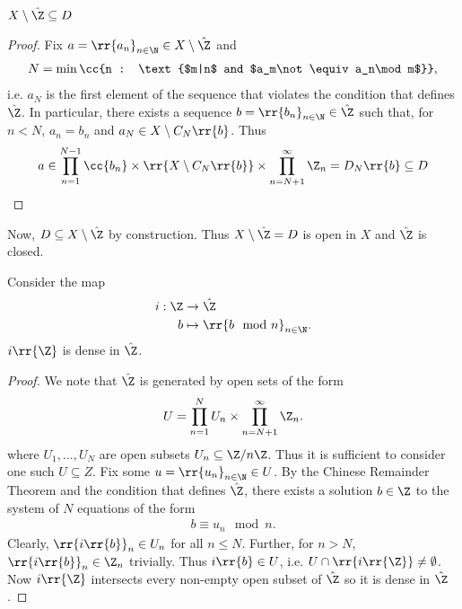 \documentclass{article}
\begin{document}
\begin{claim*}
  $X\setminus\hat\Z\subseteq D$
  \begin{proof}
    Fix $a=\rr{a_n}_{n\in\N}\in X\setminus\hat\Z$ and
    \begin{align*}
      N=\min\cc{n : \text{$m|n$ and $a_m\not\equiv a_n\mod m$}},
    \end{align*}
    i.e. $a_N$ is the first element of the sequence that violates the condition that defines $\hat\Z$.
    In particular, there exists a sequence $b=\rr{b_n}_{n\in\N}\in\hat\Z$ such that,
    for $n<N$, $a_n=b_n$ and $a_N\in X\setminus C_N\rr{b}$. Thus
    \begin{align*}
      a\in \prod_{n=1}^{N-1} \cc{b_n} \times \rr{X\setminus C_N\rr{b}} \times \prod_{n=N+1}^\infty \Z_n= D_N\rr{b}\subseteq D
    \end{align*}
  \end{proof}
\end{claim*}
Now, $D\subseteq X\setminus\hat\Z$ by construction. Thus $X\setminus\hat\Z=D$ is open in $X$
and $\hat\Z$ is closed.
\begin{claim*}
  Consider the map
  \begin{align*}
    i:\Z&\to\hat\Z \\
    b&\mapsto  \rr{b \mod n}_{n\in\N}.
  \end{align*}
  $i\rr{\Z}$ is dense in $\hat\Z$.
  \begin{proof}
    We note that $\hat\Z$ is generated by open sets of the form
    \begin{align*}
      U = \prod_{n=1}^{N}U_n \times \prod_{n=N+1}^\infty \Z_n.
    \end{align*}
    where $U_1,...,U_N$ are open subsets $U_n\subseteq \Z/n\Z$.
    Thus it is sufficient to consider one such $U\subseteq Z$.
    Fix some $u=\rr{u_n}_{n\in\N}\in U$. By the Chinese Remainder Theorem and the condition
    that defines $\hat\Z$, there exists a solution $b\in\Z$ to the system of $N$ equations
    of the form
    \begin{align*}
      b \equiv u_n \mod n.
    \end{align*}
    Clearly, $\rr{i\rr{b}}_{n}\in U_n$ for all $n\leq N$. Further, for $n>N$, $\rr{i\rr{b}}_n\in\Z_n$
    trivially. Thus $i\rr{b}\in U$, i.e. $U\cap\rr{i\rr{\Z}}\neq\emptyset$. Now $i\rr{\Z}$ intersects
    every non-empty open subset of $\hat\Z$ so it is dense in $\hat\Z$.
  \end{proof}
\end{claim*}
\end{document}
